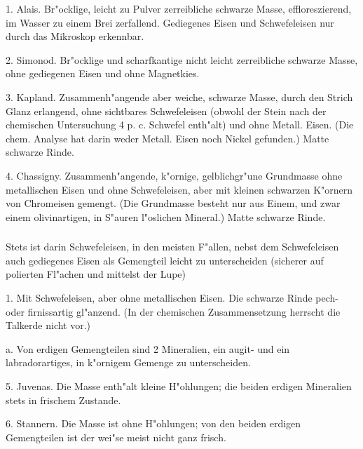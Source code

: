 \documentclass[a4paper, 11pt, oneside, polutonikogreek, german]{article}
\begin{document}
1. Alais. Br"ocklige, leicht zu Pulver zerreibliche schwarze Masse, effloreszierend, im Wasser zu einem Brei zerfallend. Gediegenes Eisen und Schwefeleisen nur durch das Mikroskop erkennbar.

2. Simonod. Br"ocklige und scharfkantige nicht leicht zerreibliche schwarze Masse, ohne gediegenen Eisen und ohne Magnetkies.

3. Kapland. Zusammenh"angende aber weiche, schwarze Masse, durch den Strich Glanz erlangend, ohne sichtbares Schwefeleisen (obwohl der Stein nach der chemischen Untersuchung 4 p. c. Schwefel enth"alt) und ohne Metall. Eisen. (Die chem. Analyse hat darin weder Metall. Eisen noch Nickel gefunden.) Matte schwarze Rinde.

4. Chassigny. Zusammenh"angende, k"ornige, gelblichgr"une Grundmasse ohne metallischen Eisen und ohne Schwefeleisen, aber mit kleinen schwarzen K"ornern von Chromeisen gemengt. (Die Grundmasse besteht nur aus Einem, und zwar einem olivinartigen, in S"auren l"oslichen Mineral.) Matte schwarze Rinde.
\subsubsection{}
\paragraph{}
Stets ist darin Schwefeleisen, in den meisten F"allen, nebst dem Schwefeleisen auch gediegenes Eisen als Gemengteil leicht zu unterscheiden (sicherer auf polierten Fl"achen und mittelst der Lupe)

\vspace{2ex}

1. Mit Schwefeleisen, aber ohne metallischen Eisen. Die schwarze Rinde pech- oder firnissartig gl"anzend. (In der chemischen Zusammensetzung herrscht die Talkerde nicht vor.)

\vspace{2ex}

\hspace*{10mm}a. Von erdigen Gemengteilen sind 2 Mineralien, ein augit- und ein labradorartiges, in k"ornigem Gemenge zu unterscheiden.

\hspace*{15mm}5. Juvenas. Die Masse enth"alt kleine H"ohlungen; die beiden erdigen Mineralien stets in frischem Zustande.

\hspace*{15mm}6. Stannern. Die Masse ist ohne H"ohlungen; von den beiden erdigen Gemengteilen ist der wei"se meist nicht ganz frisch.
\end{document}
